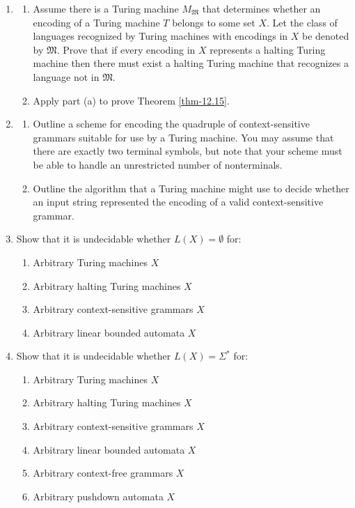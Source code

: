 \begin{enumerate}[{12.}1.]
\item \begin{enumerate}
\item Assume there is a Turing machine $M_{\mathfrak{M}}$ that determines
whether an encoding of a Turing machine $T$ belongs to some set $X$. Let the
class of languages recognized by Turing machines with encodings in $X$ be
denoted by $\mathfrak{M}$. Prove that if every encoding in $X$ represents a
halting Turing machine then there must exist a halting Turing machine that
recognizes a language not in $\mathfrak{M}$.
\item Apply part (a) to prove Theorem \ref{thm-12.15}.
\end{enumerate}

\item \begin{enumerate}
\item Outline a scheme for encoding the quadruple of context-sensitive grammars
suitable for use by a Turing machine. You may assume that there are exactly two
terminal symbols, but note that your scheme must be able to handle an
unrestricted number of nonterminals.
\item Outline the algorithm that a Turing machine might use to decide whether an
input string represented the encoding of a valid context-sensitive grammar.
\end{enumerate}

\item Show that it is undecidable whether $L(X)=\emptyset$ for:
\begin{enumerate}
\item Arbitrary Turing machines $X$
\item Arbitrary halting Turing machines $X$
\item Arbitrary context-sensitive grammars $X$
\item Arbitrary linear bounded automata $X$
\end{enumerate}

\item Show that it is undecidable whether $L(X)=\Sigma^*$ for:
\begin{enumerate}
\item Arbitrary Turing machines $X$
\item Arbitrary halting Turing machines $X$
\item Arbitrary context-sensitive grammars $X$
\item Arbitrary linear bounded automata $X$
\item Arbitrary context-free grammars $X$
\item Arbitrary pushdown automata $X$
\end{enumerate}


\end{enumerate}

